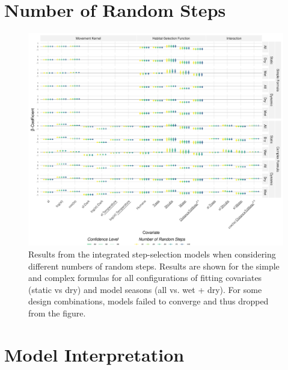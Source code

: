 \documentclass[../FinalThesis.tex]{subfiles}
\begin{document}
\newpage
\section{Number of Random Steps}

\begin{figure}[htpb]
 \begin{center}
  \includegraphics[width = \textwidth]{Figures/Stability.png}
  \caption{Results from the integrated step-selection models when considering
  different numbers of random steps. Results are shown for the simple and
  complex formulas for all configurations of fitting covariates (static vs dry)
  and model seasons (all vs. wet + dry). For some design combinations, models
  failed to converge and thus dropped from the figure.}
  \label{Stability}
 \end{center}
\end{figure}

\newpage
\section{Model Interpretation}
\end{document}
